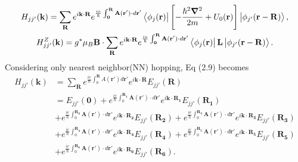 \documentclass{report}
\newcommand{\f}[2]{\dfrac{#1}{#2}}
\begin{document}
\begin{gather}
	H_{jj'}(\mathbf{k})
	= \sum_{\mathbf{R}} e^{i \mathbf{k \cdot R}} e^{\frac{ie}{\hbar} \int_{\mathbf{0}}^{\mathbf{R}} \mathbf{A(\mathbf{r'})} \cdot d \mathbf{r'} } \bra{\phi_{j}(\mathbf{r})} \left[ -\f{\hbar^{2} \boldsymbol{\nabla}^{2}}{2m} + U_{0} (\mathbf{r}) \right] \ket{\phi_{j'}(\mathbf{r - R})},\\
	H_{jj'}^{Z}(\mathbf{k})
	= g^{*} \mu_{B} \mathbf{B} \cdot \sum_{\mathbf{R}} e^{i\mathbf{k\cdot R}} e^{\frac{ie}{\hbar} \int_{\mathbf{0}}^{\mathbf{R}} \mathbf{A(\mathbf{r'})} \cdot d\mathbf{r'} } \bra{\phi_{j}(\mathbf{r})} \mathbf{L} \ket{\phi_{j'}(\mathbf{r - R})}.
\end{gather}
Considering only nearest neighbor(NN) hopping, Eq (2.9) becomes
\begin{equation}
	\begin{aligned}
		H_{jj'}(\mathbf{k})
		 & = \sum_{\mathbf{R}} e^{\frac{ie}{\hbar}\int_{0}^{\mathbf{R}}A(\mathbf{r'})d\mathbf{r'}}e^{i\mathbf{k\cdot R}} E_{jj'}(\mathbf{R})                                                                                                                                         \\
		 & = E_{jj'}(\mathbf{0}) + e^{\frac{ie}{\hbar}\int_{0}^{\mathbf{R_1}}\mathbf{A(\mathbf{r'})}\cdot d\mathbf{r'}}e^{i\mathbf{k\cdot R_1}} E_{jj'}(\mathbf{R_1})                                                                                                                \\
		 & + e^{\frac{ie}{\hbar}\int_{0}^{\mathbf{R_2}}\mathbf{A(\mathbf{r'})}\cdot d\mathbf{r'}}e^{i\mathbf{k\cdot R_2}} E_{jj'}(\mathbf{R_2}) + e^{\frac{ie}{\hbar}\int_{0}^{\mathbf{R_3}}\mathbf{A(\mathbf{r'})}\cdot d\mathbf{r'}}e^{i\mathbf{k\cdot R_3}} E_{jj'}(\mathbf{R_3}) \\
		 & + e^{\frac{ie}{\hbar}\int_{0}^{\mathbf{R_4}}\mathbf{A(\mathbf{r'})}\cdot d\mathbf{r'}}e^{i\mathbf{k\cdot R_4}} E_{jj'}(\mathbf{R_4}) + e^{\frac{ie}{\hbar}\int_{0}^{\mathbf{R_5}}\mathbf{A(\mathbf{r'})}\cdot d\mathbf{r'}}e^{i\mathbf{k\cdot R_5}} E_{jj'}(\mathbf{R_5}) \\
		 & + e^{\frac{ie}{\hbar}\int_{0}^{\mathbf{R_6}}\mathbf{A(\mathbf{r'})}\cdot d\mathbf{r'}}e^{i\mathbf{k\cdot R_6}} E_{jj'}(\mathbf{R_6}).
	\end{aligned}
\end{equation}
\end{document}
